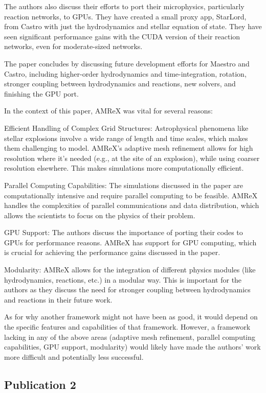 \documentclass[12pt, a4paper]{scrartcl}
\begin{document}
The authors also discuss their efforts to port their microphysics, particularly reaction networks, to GPUs. 
They have created a small proxy app, StarLord, from Castro with just the hydrodynamics and stellar equation 
of state. They have seen significant performance gains with the CUDA version of their reaction networks, even 
for moderate-sized networks.

The paper concludes by discussing future development efforts for Maestro and Castro, including higher-order 
hydrodynamics and time-integration, rotation, stronger coupling between hydrodynamics and reactions, new solvers, 
and finishing the GPU port.

In the context of this paper, AMReX was vital for several reasons:

Efficient Handling of Complex Grid Structures: Astrophysical phenomena like stellar explosions involve a wide 
range of length and time scales, which makes them challenging to model. AMReX's adaptive mesh refinement allows 
for high resolution where it's needed (e.g., at the site of an explosion), while using coarser resolution elsewhere. 
This makes simulations more computationally efficient.

Parallel Computing Capabilities: The simulations discussed in the paper are computationally intensive and require 
parallel computing to be feasible. AMReX handles the complexities of parallel communications and data distribution, 
which allows the scientists to focus on the physics of their problem.

GPU Support: The authors discuss the importance of porting their codes to GPUs for performance reasons. AMReX has 
support for GPU computing, which is crucial for achieving the performance gains discussed in the paper.

Modularity: AMReX allows for the integration of different physics modules (like hydrodynamics, reactions, etc.) in a 
modular way. This is important for the authors as they discuss the need for stronger coupling between hydrodynamics 
and reactions in their future work.

As for why another framework might not have been as good, it would depend on the specific features and capabilities 
of that framework. However, a framework lacking in any of the above areas (adaptive mesh refinement, parallel 
computing capabilities, GPU support, modularity) would likely have made the authors' work more difficult and 
potentially less successful.

\subsection{Publication 2}
\end{document}
